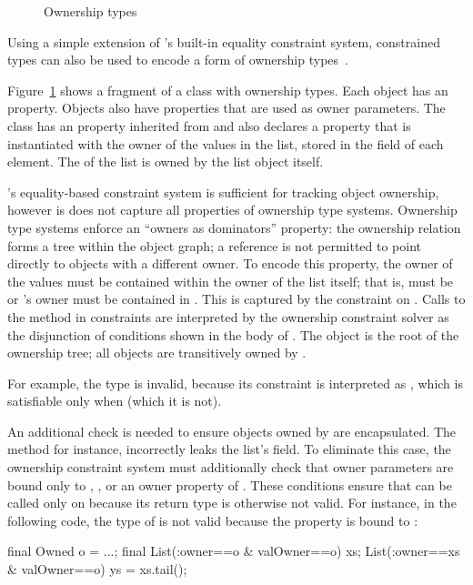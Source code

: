 \begin{figure}[t]
\caption{Ownership types}
\label{fig:ownership}
\end{figure}

Using a simple extension of \Xten{}'s built-in equality
constraint system,
constrained types can also be used to encode a form of ownership
types~\cite{ownership-types,liskov-popl2003}.

Figure~\ref{fig:ownership} shows a fragment of a 
class with ownership types.
Each  object has an  property.  Objects
also have properties that are used as owner parameters.
%
The  class has an  property inherited from
 and also declares a  property that is
instantiated with the owner of the values in the list, stored in
the  field of each element.  The  of the
list is owned by the list object itself.

\Xten{}'s equality-based constraint system is sufficient for
tracking object ownership, however is does not capture all
properties of ownership type systems.
Ownership type systems enforce an ``owners as dominators''
property: the ownership relation forms a tree within the object
graph; a reference is not permitted to point directly to objects
with a different owner.
%
To encode this property, the owner of
the values  must be contained within the owner
of the list itself; that is,  must be 
or 's owner must be contained in .
This is captured by the constraint  on
.  Calls to the  method in constraints
are interpreted by the ownership constraint solver as the
disjunction of conditions shown in the body of .
The object  is the root of the ownership tree; 
all objects are transitively owned by .

For example, the type 
is invalid, because
its constraint is interpreted as
,
which is satisfiable only when  (which it is not).

An additional check is needed to ensure objects owned by
 are encapsulated.
The  method for instance, incorrectly leaks the
list's  field.  To eliminate this case, the ownership
constraint system must additionally check that owner parameters
are bound only to 
, , or an owner property of .
These conditions ensure that  can be called only on
 because its return type is otherwise not valid.
For instance, in the following code, the type of  is
not valid because the  property is bound to :
\begin{displayxten}
    final Owned o = ...;
    final List(:owner==o & valOwner==o) xs;
    List(:owner==xs & valOwner==o) ys = xs.tail();
\end{displayxten}

